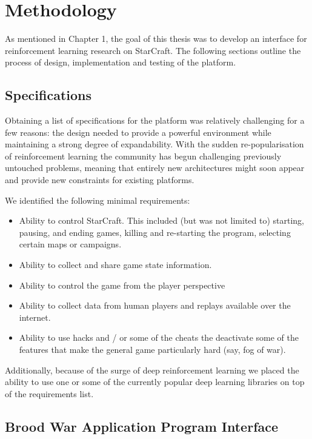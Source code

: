 \chapter{Methodology}

As mentioned in Chapter 1, the goal of this thesis was to develop an interface
for reinforcement learning research on StarCraft. The following sections
outline the process of design, implementation and testing of the platform.

\section{Specifications}

Obtaining a list of specifications for the platform was relatively challenging
for a few reasons: the design needed to provide a powerful environment while
maintaining a strong degree of expandability. With the sudden re-popularisation
of reinforcement learning the community has begun challenging previously
untouched problems, meaning that entirely new architectures might soon appear
and provide new constraints for existing platforms.

We identified the following minimal requirements:

\begin{itemize}
\item Ability to control StarCraft. This included (but was not limited to)
  starting, pausing, and ending games, killing and re-starting the program,
  selecting certain maps or campaigns.
\item Ability to collect and share game state information.
\item Ability to control the game from the player perspective
\item Ability to collect data from human players and replays available over the
  internet.
\item Ability to use hacks and / or some of the cheats the deactivate some of the
  features that make the general game particularly hard (say, fog of war). 
\end{itemize}

Additionally, because of the surge of deep reinforcement learning we placed the
ability to use one or some of the currently popular deep learning libraries on
top of the requirements list.


\section{Brood War Application Program Interface}

